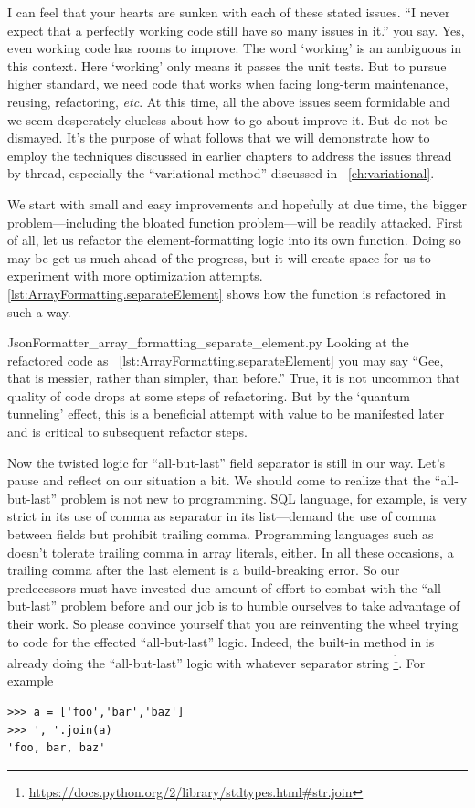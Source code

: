 I can feel that your hearts are sunken with each of these stated issues.
``I never expect that a perfectly working code still have so many issues in it.'' you say.
Yes, even working code has rooms to improve.
The word `working' is an ambiguous in this context.
Here `working' only means it passes the unit tests.
But to pursue higher standard, we need code that works when facing long-term maintenance,
reusing, refactoring, \textit{etc}.
At this time, all the above issues seem formidable and we seem desperately clueless about how to
go about improve it.
But do not be dismayed.
It's the purpose of what follows that we will demonstrate how to employ the techniques discussed in
earlier chapters to address the issues thread by thread, especially the ``variational method''
discussed in ~\autoref{ch:variational}.

We start with small and easy improvements and
hopefully at due time, the bigger problem---including the bloated function problem---will be readily
attacked.
First of all, let us refactor the element-formatting logic into its own function.
Doing so may be get us much ahead of the progress,
but it will create space for us to experiment with more optimization attempts.
\@\autoref{lst:ArrayFormatting.separateElement} shows how the function  is
refactored in such a way.

{JsonFormatter_array_formatting_separate_element.py}
Looking at the refactored code as ~\autoref{lst:ArrayFormatting.separateElement} you may say
``Gee, that is messier, rather than simpler, than before.''
True, it is not uncommon that quality of code drops at some steps of refactoring.
But by the `quantum tunneling' effect, this is a beneficial attempt with
value to be manifested later and is critical to subsequent refactor steps.

Now the twisted logic for ``all-but-last'' field separator is still in our way.
Let's pause and reflect on our situation a bit.
We should come to realize that the ``all-but-last'' problem is not new to programming.
SQL language, for example, is very strict in its use of comma as separator in its 
list---demand the use of comma between fields but prohibit trailing comma.
Programming languages such as \cpp doesn't tolerate trailing comma in array literals, either.
In all these occasions, a trailing comma after the last element is a build-breaking error.
So our predecessors must have invested due amount of effort to combat with the ``all-but-last''
problem before and our job is to humble ourselves to take advantage of their work.
So please convince yourself that you are reinventing the wheel trying to code for the effected
``all-but-last'' logic.
Indeed, the built-in method  in \python is already doing the ``all-but-last'' logic
with whatever separator string
\footnote{\url{https://docs.python.org/2/library/stdtypes.html\#str.join}}.
For example
\begin{lstlisting}
>>> a = ['foo','bar','baz']
>>> ', '.join(a)
'foo, bar, baz'
\end{lstlisting}


